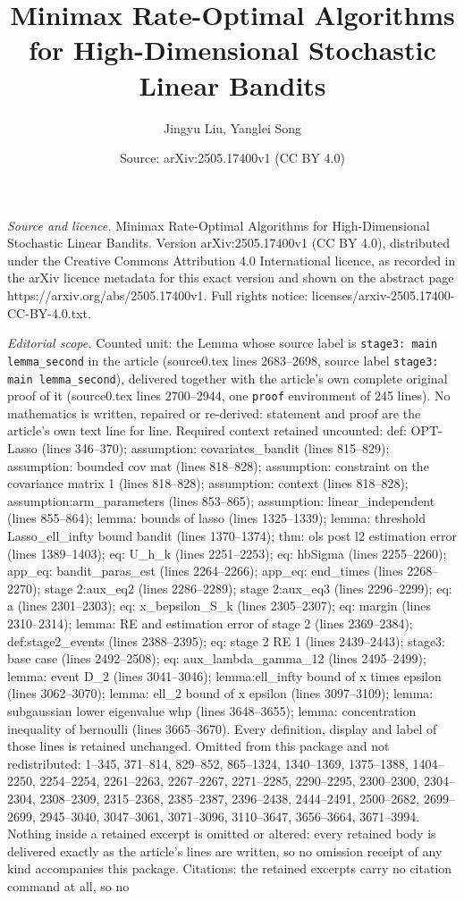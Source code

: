\documentclass[10pt,a4paper]{amsart}
\title[Minimax Rate-Optimal Algorithms for High-Dimensional Stochas]{Minimax Rate-Optimal Algorithms for High-Dimensional Stochastic Linear Bandits}
\author{Jingyu Liu, Yanglei Song}
\date{Source: arXiv:2505.17400v1 (CC BY 4.0)}
\begin{document}
\maketitle

\noindent\emph{Source and licence.} Minimax Rate-Optimal Algorithms for High-Dimensional Stochastic Linear Bandits. Version arXiv:2505.17400v1 (CC BY 4.0), distributed under the Creative Commons Attribution 4.0 International licence, as recorded in the arXiv licence metadata for this exact version and shown on the abstract page https://arxiv.org/abs/2505.17400v1. Full rights notice: licenses/arxiv-2505.17400-CC-BY-4.0.txt.\par\smallskip

\noindent\textit{Editorial scope.} Counted unit: the Lemma whose source label is \texttt{stage3: main lemma\_second} in the article (source0.tex lines 2683--2698, source label \texttt{stage3: main lemma\_second}), delivered together with the article's own complete original proof of it (source0.tex lines 2700--2944, one \texttt{proof} environment of 245 lines). No mathematics is written, repaired or re-derived: statement and proof are the article's own text line for line. Required context retained uncounted: def: OPT-Lasso (lines 346--370); assumption: covariates\_bandit (lines 815--829); assumption: bounded cov mat (lines 818--828); assumption: constraint on the covariance matrix 1 (lines 818--828); assumption: context (lines 818--828); assumption:arm\_parameters (lines 853--865); assumption: linear\_independent (lines 855--864); lemma: bounds of lasso (lines 1325--1339); lemma: threshold Lasso\_ell\_infty bound bandit (lines 1370--1374); thm: ols post l2 estimation error (lines 1389--1403); eq: U\_h\_k (lines 2251--2253); eq: hbSigma (lines 2255--2260); app\_eq: bandit\_paras\_est (lines 2264--2266); app\_eq: end\_times (lines 2268--2270); stage 2:aux\_eq2 (lines 2286--2289); stage 2:aux\_eq3 (lines 2296--2299); eq: a (lines 2301--2303); eq: x\_bepsilon\_S\_k (lines 2305--2307); eq: margin (lines 2310--2314); lemma: RE and estimation error of stage 2 (lines 2369--2384); def:stage2\_events (lines 2388--2395); eq: stage 2 RE 1 (lines 2439--2443); stage3: base case (lines 2492--2508); eq: aux\_lambda\_gamma\_12 (lines 2495--2499); lemma: event D\_2 (lines 3041--3046); lemma:ell\_infty bound of x times epsilon (lines 3062--3070); lemma: ell\_2 bound of x epsilon (lines 3097--3109); lemma: subgaussian lower eigenvalue whp (lines 3648--3655); lemma: concentration inequality of bernoulli (lines 3665--3670). Every definition, display and label of those lines is retained unchanged. Omitted from this package and not redistributed: 1--345, 371--814, 829--852, 865--1324, 1340--1369, 1375--1388, 1404--2250, 2254--2254, 2261--2263, 2267--2267, 2271--2285, 2290--2295, 2300--2300, 2304--2304, 2308--2309, 2315--2368, 2385--2387, 2396--2438, 2444--2491, 2500--2682, 2699--2699, 2945--3040, 3047--3061, 3071--3096, 3110--3647, 3656--3664, 3671--3994. Nothing inside a retained excerpt is omitted or altered: every retained body is delivered exactly as the article's lines are written, so no omission receipt of any kind accompanies this package. Citations: the retained excerpts carry no citation command at all, so no 
\end{document}
